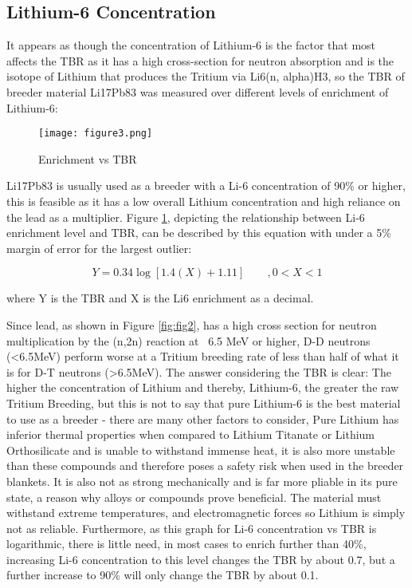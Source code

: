 \documentclass{article}
\begin{document}
\subsection{Lithium-6 Concentration}

It appears as though the concentration of Lithium-6 is the factor that most affects the TBR as it has a high cross-section for neutron absorption and is the isotope of Lithium that produces the Tritium via Li6(n, alpha)H3, so the TBR of breeder material Li17Pb83 was measured over different levels of enrichment of Lithium-6:

\begin{figure}[hbt!]
  \centering
  \texttt{[image: figure3.png]}
  \caption{Enrichment vs TBR}
  \label{fig:fig3}
\end{figure}


Li17Pb83 is usually used as a breeder with a Li-6 concentration of 90\% or higher, this is feasible as it has a low overall Lithium concentration and high reliance on the lead as a multiplier. Figure \ref{fig:fig3}, depicting the relationship between Li-6 enrichment level and TBR, can be described by this equation with under a 5\% margin of error for the largest outlier:

\begin{equation}
Y = 0.34 \log{[1.4(X)  +  1.11]} \quad \quad , {0<X<1}
\end{equation}

where Y is the TBR and X is the Li6 enrichment as a decimal.

Since lead, as shown in Figure \ref{fig:fig2}, has a high cross section for neutron multiplication by the (n,2n) reaction at ~6.5 MeV or higher, D-D neutrons (<6.5MeV) perform worse at a Tritium breeding rate of less than half of what it is for D-T neutrons (>6.5MeV). 
The answer considering the TBR is clear: The higher the concentration of Lithium and thereby, Lithium-6, the greater the raw Tritium Breeding, but this is not to say that pure Lithium-6 is the best material to use as a breeder - there are many other factors to consider, Pure Lithium has inferior thermal properties when compared to Lithium Titanate or Lithium Orthosilicate and is unable to withstand immense heat, it is also more unstable than these compounds and therefore poses a safety risk when used in the breeder blankets. It is also not as strong mechanically and is far more pliable in its pure state, a reason why alloys or compounds prove beneficial. The material must withstand extreme temperatures, and electromagnetic forces so Lithium is simply not as reliable. 
Furthermore, as this graph for Li-6 concentration vs TBR is logarithmic, there is little need, in most cases to enrich further than 40\%, increasing Li-6 concentration to this level changes the TBR by about 0.7, but a further increase to 90\% will only change the TBR by about 0.1. 
\end{document}
